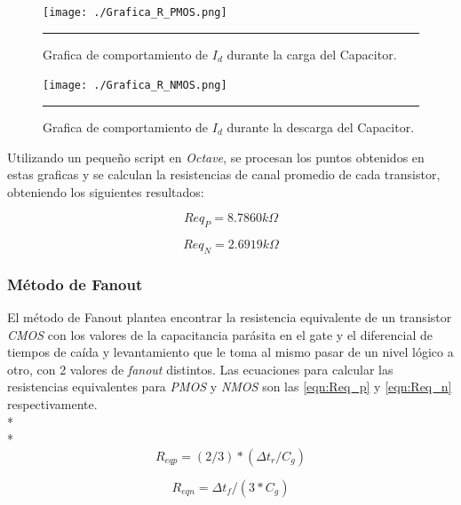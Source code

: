 \documentclass[12pt,a4paper]{article} %
\begin{document}
\begin{figure}[htbp]
  \centering
    \texttt{[image: ./Grafica\_R\_PMOS.png]}
   \rule{35em}{0.3pt}
  \caption[G_Carga]{Grafica de comportamiento de $\textit{I}_{\textit{d}}$ durante la carga del Capacitor.}
  \label{fig:Grafica_R_PMOS}
\end{figure}

\begin{figure}[htbp]
 \centering
    \texttt{[image: ./Grafica\_R\_NMOS.png]}
    \rule{35em}{0.3pt}
  \caption[G_Descarga]{Grafica de comportamiento de $\textit{I}_{\textit{d}}$ durante la descarga del Capacitor.}
  \label{fig:Grafica_R_NMOS}
\end{figure}

Utilizando un pequeño script en \textit{Octave}, se procesan los puntos obtenidos en estas graficas y se calculan la resistencias de canal promedio de cada transistor, obteniendo los siguientes resultados:

\begin{equation}\label{eqn:R_PMOS}
Req_P = 8.7860k\Omega
\end{equation}

\begin{equation}\label{eqn:R_NMOS}
Req_N = 2.6919k\Omega
\end{equation}

\subsubsection{Método de Fanout}

El método de Fanout plantea encontrar la resistencia equivalente de un transistor \textit{CMOS} con los valores de la capacitancia parásita en el gate y el diferencial de tiempos de caída y levantamiento que le toma al mismo pasar de un nivel lógico a otro, con 2 valores de \textit{fanout} distintos. Las ecuaciones para calcular las resistencias equivalentes para \textit{PMOS} y \textit{NMOS} son las \ref{eqn:Req_p} y \ref{eqn:Req_n} respectivamente.\\*
\\*
\begin{equation}\label{eqn:Req_p}
R_{eqp}=(2/3)*( \Delta t_{r}/C_{g})
\end{equation}

\begin{equation}\label{eqn:Req_n}
R_{eqn}= \Delta t_{f}/(3*C_{g})
\end{equation}
\end{document}

